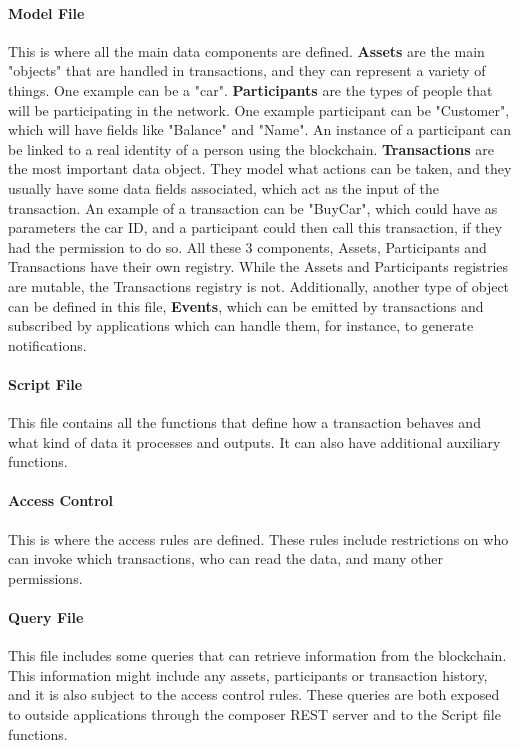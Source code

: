 \paragraph{Model File} This is where all the main data components are defined. \textbf{Assets} are the main "objects" that are handled in transactions, and they can represent a variety of things. One example can be a "car". \textbf{Participants} are the types of people that will be participating in the network. One example participant can be "Customer", which will have fields like "Balance" and "Name". An instance of a participant can be linked to a real identity of a person using the blockchain. \textbf{Transactions} are the most important data object. They model what actions can be taken, and they usually have some data fields associated, which act as the input of the transaction. An example of a transaction can be "BuyCar", which could have as parameters the car ID, and a participant could then call this transaction, if they had the permission to do so. All these 3 components, Assets, Participants and Transactions have their own registry. While the Assets and Participants registries are mutable, the Transactions registry is not. Additionally, another type of object can be defined in this file, \textbf{Events}, which can be emitted by transactions and subscribed by applications which can handle them, for instance, to generate notifications.

\paragraph{Script File} This file contains all the functions that define how a transaction behaves and what kind of data it processes and outputs. It can also have additional auxiliary functions.

\paragraph{Access Control} This is where the access rules are defined. These rules include restrictions on who can invoke which transactions, who can read the data, and many other permissions.

\paragraph{Query File} This file includes some queries that can retrieve information from the blockchain. This information might include any assets, participants or transaction history, and it is also subject to the access control rules. These queries are both exposed to outside applications through the composer REST server and to the Script file functions.

